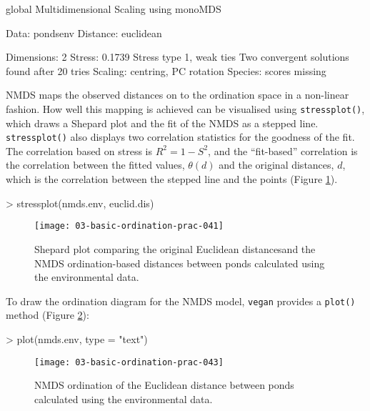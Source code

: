 \documentclass[a4paper,10pt]{article}
\newcommand{\vegan}{\texttt{vegan}\xspace}
\begin{document}
{\begin{Schunk}
\begin{Soutput}
global Multidimensional Scaling using monoMDS

Data:     pondsenv 
Distance: euclidean 

Dimensions: 2 
Stress:     0.1739 
Stress type 1, weak ties
Two convergent solutions found after 20 tries
Scaling: centring, PC rotation 
Species: scores missing
\end{Soutput}
\end{Schunk}

NMDS maps the observed distances on to the ordination space in a non-linear fashion. How well this mapping is achieved can be visualised using \texttt{stressplot()}, which draws a Shepard plot and the fit of the NMDS as a stepped line. \texttt{stressplot()} also displays two correlation statistics for the goodness of the fit. The correlation based on stress is $R^2=1-S^2$, and the ``fit-based'' correlation is the correlation between the fitted values, $\theta(d)$ and the original distances, $d$, which is the correlation between the stepped line and the points (Figure \ref{stressplot}).

\begin{Schunk}
\begin{Sinput}
> stressplot(nmds.env, euclid.dis)
\end{Sinput}
\end{Schunk}

\begin{figure}[t]
\begin{center}
\texttt{[image: 03-basic-ordination-prac-041]}
\caption{\label{stressplot}Shepard plot comparing the original Euclidean distancesand the NMDS ordination-based distances between ponds calculated using the environmental data.}
\end{center}
\end{figure}

To draw the ordination diagram for the NMDS model, \vegan provides a \texttt{plot()} method (Figure \ref{nmdsplot}):


\begin{Schunk}
\begin{Sinput}
> plot(nmds.env, type = "text")
\end{Sinput}
\end{Schunk}

\begin{figure}[t]
\begin{center}
\texttt{[image: 03-basic-ordination-prac-043]}
\caption{\label{nmdsplot}NMDS ordination of the Euclidean distance between ponds calculated using the environmental data.}
\end{center}
\end{figure}

}
\end{document}
